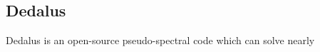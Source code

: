 {\color{purple}    
\subsection{Dedalus}}

Dedalus is an open-source pseudo-spectral code which can solve nearly  
